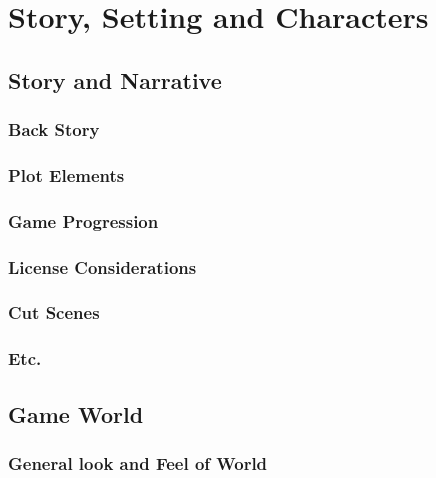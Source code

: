 
\section{Story, Setting and Characters}

\subsection{Story and Narrative}

\subsubsection{Back Story}

\subsubsection{Plot Elements}

\subsubsection{Game Progression}

\subsubsection{License Considerations}

\subsubsection{Cut Scenes}



\subsubsection{Etc.}

\subsection{Game World}

\subsubsection{General look and Feel of World}

